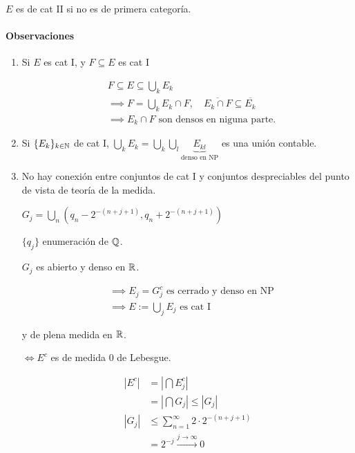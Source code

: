 \begin{fdefinition}
    $E$ es de cat II si no es de primera categoría.
\end{fdefinition}

\paragraph*{Observaciones}

\begin{enumerate}
    \item Si $E$ es cat I, y $F\subseteq E$ es cat I
    
    \begin{align*}&F\subseteq E\subseteq \bigcup_k E_k\\
    &\implies F=\bigcup_k E_k\cap F,\quad \overline{E_k\cap F}\subseteq \overline{E_k}\\
    &\implies E_k\cap F \text{ son densos en niguna parte.}
    \end{align*}

    \item Si $\{E_k\}_{k\in\mathbb{N}}$ de cat I, $\bigcup_{k} E_k=\bigcup_{k}\bigcup_l \underbrace{E_{kl}}_{\text{denso en NP}}$ es una unión contable.
    
    \item No hay conexión entre conjuntos de cat I y conjuntos despreciables del punto de vista de teoría de la medida.
    \begin{fexample}
        $G_j=\bigcup_{n} (q_n-2^{-(n+j+1)},q_n+2^{-(n+j+1)})$

        $\{q_j\}$ enumeración de $\mathbb{Q}$.

        $G_j$ es abierto y denso en $\mathbb{R}$.

        \begin{align*}
            &\implies E_j=G_j^c \text{ es cerrado y denso en NP}\\
            &\implies E:=\bigcup_j E_j \text{ es cat I}
        \end{align*}

        y de plena medida en $\mathbb{R}$.

        $\iff E^c$ es de medida $0$ de Lebesgue.

        \begin{align*}
            |E^c|&=|\bigcap E_j^c|\\
            &=|\bigcap G_j|\leq |G_j|\\
            |G_j|&\leq \sum_{n=1}^\infty 2\cdot 2^{-(n+j+1)}\\
            &=2^{-j}\xrightarrow{j\to\infty} 0
        \end{align*}
    \end{fexample}
    
\end{enumerate}


